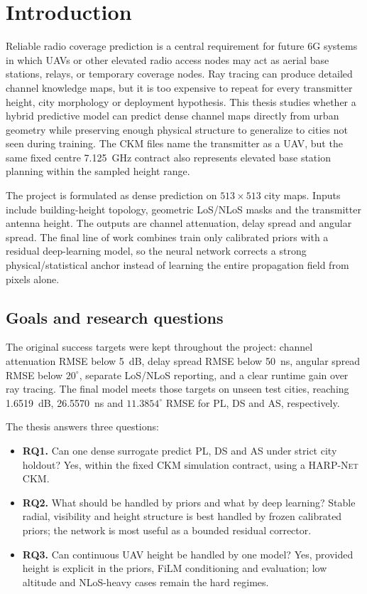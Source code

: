 \chapter{Introduction}

Reliable radio coverage prediction is a central requirement for future 6G
systems in which UAVs or other elevated radio access nodes may act as aerial
base stations, relays, or temporary coverage nodes. Ray tracing can produce
detailed channel knowledge maps, but it
is too expensive to repeat for every transmitter height, city morphology or
deployment hypothesis. This thesis studies whether a hybrid predictive model can
predict dense channel maps directly from urban geometry while preserving enough
physical structure to generalize to cities not seen during training. The CKM
files name the transmitter as a UAV, but the same fixed centre
\SI{7.125}{GHz} contract also represents elevated base station planning within
the sampled height range.

The project is formulated as dense prediction on \(513\times513\) city maps.
Inputs include building-height topology, geometric LoS/NLoS masks and the
transmitter antenna height. The outputs are channel attenuation, delay spread and angular spread. The
final line of work combines train only calibrated priors with a residual
deep-learning model, so the neural network corrects a strong physical/statistical
anchor instead of learning the entire propagation field from pixels alone.

\section{Goals and research questions}

The original success targets were kept throughout the project:
channel attenuation RMSE below \SI{5}{dB}, delay spread RMSE below \SI{50}{ns},
angular spread RMSE below \(20^\circ\), separate LoS/NLoS reporting, and a clear
runtime gain over ray tracing. The final model meets those targets on unseen
test cities, reaching \SI{1.6519}{dB}, \SI{26.5570}{ns} and \(11.3854^\circ\)
RMSE for PL, DS and AS, respectively.

The thesis answers three questions:
\begin{itemize}
  \item \textbf{RQ1.} Can one dense surrogate predict PL, DS and AS under strict
        city holdout? Yes, within the fixed CKM simulation contract, using a
        \textsc{HARP-Net CKM}.
  \item \textbf{RQ2.} What should be handled by priors and what by deep
        learning? Stable radial, visibility and height structure is best handled
        by frozen calibrated priors; the network is most useful as a bounded
        residual corrector.
  \item \textbf{RQ3.} Can continuous UAV height be handled by one model? Yes,
        provided height is explicit in the priors, FiLM conditioning and
        evaluation; low altitude and NLoS-heavy cases remain the hard regimes.
\end{itemize}

